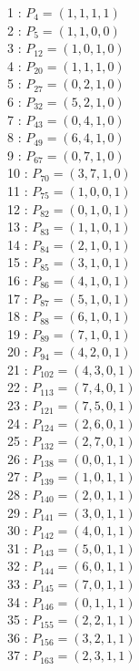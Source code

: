 \documentclass{article}
\begin{document}
{\begin{multicols}{3}
1 : $P_{4}=( 1, 1, 1, 1 )$\\
2 : $P_{5}=( 1, 1, 0, 0 )$\\
3 : $P_{12}=( 1, 0, 1, 0 )$\\
4 : $P_{20}=( 1, 1, 1, 0 )$\\
5 : $P_{27}=( 0, 2, 1, 0 )$\\
6 : $P_{32}=( 5, 2, 1, 0 )$\\
7 : $P_{43}=( 0, 4, 1, 0 )$\\
8 : $P_{49}=( 6, 4, 1, 0 )$\\
9 : $P_{67}=( 0, 7, 1, 0 )$\\
10 : $P_{70}=( 3, 7, 1, 0 )$\\
11 : $P_{75}=( 1, 0, 0, 1 )$\\
12 : $P_{82}=( 0, 1, 0, 1 )$\\
13 : $P_{83}=( 1, 1, 0, 1 )$\\
14 : $P_{84}=( 2, 1, 0, 1 )$\\
15 : $P_{85}=( 3, 1, 0, 1 )$\\
16 : $P_{86}=( 4, 1, 0, 1 )$\\
17 : $P_{87}=( 5, 1, 0, 1 )$\\
18 : $P_{88}=( 6, 1, 0, 1 )$\\
19 : $P_{89}=( 7, 1, 0, 1 )$\\
20 : $P_{94}=( 4, 2, 0, 1 )$\\
21 : $P_{102}=( 4, 3, 0, 1 )$\\
22 : $P_{113}=( 7, 4, 0, 1 )$\\
23 : $P_{121}=( 7, 5, 0, 1 )$\\
24 : $P_{124}=( 2, 6, 0, 1 )$\\
25 : $P_{132}=( 2, 7, 0, 1 )$\\
26 : $P_{138}=( 0, 0, 1, 1 )$\\
27 : $P_{139}=( 1, 0, 1, 1 )$\\
28 : $P_{140}=( 2, 0, 1, 1 )$\\
29 : $P_{141}=( 3, 0, 1, 1 )$\\
30 : $P_{142}=( 4, 0, 1, 1 )$\\
31 : $P_{143}=( 5, 0, 1, 1 )$\\
32 : $P_{144}=( 6, 0, 1, 1 )$\\
33 : $P_{145}=( 7, 0, 1, 1 )$\\
34 : $P_{146}=( 0, 1, 1, 1 )$\\
35 : $P_{155}=( 2, 2, 1, 1 )$\\
36 : $P_{156}=( 3, 2, 1, 1 )$\\
37 : $P_{163}=( 2, 3, 1, 1 )$\\

\end{multicols}}
\end{document}
